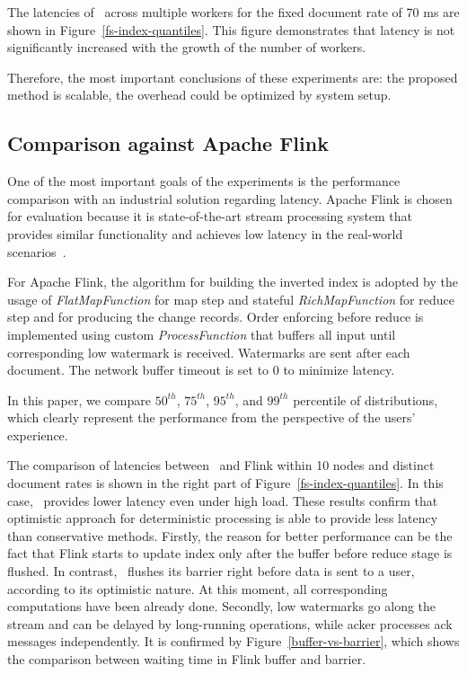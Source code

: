 The latencies of \FlameStream\ across multiple workers for the fixed document rate of 70 ms are shown in Figure~\ref{fs-index-quantiles}. This figure demonstrates that latency is not significantly increased with the growth of the number of workers. 

Therefore, the most important conclusions of these experiments are: the proposed method is scalable, the overhead could be optimized by system setup.

\subsection{Comparison against Apache Flink}

One of the most important goals of the experiments is the performance comparison with an industrial solution regarding latency. Apache Flink is chosen for evaluation because it is state-of-the-art stream processing system that provides similar functionality and achieves low latency in the real-world scenarios~\cite{S7530084}. 

For Apache Flink, the algorithm for building the inverted index is adopted by the usage of {\it FlatMapFunction} for map step and stateful {\it RichMapFunction} for reduce step and for producing the change records. Order enforcing before reduce is implemented using custom {\it ProcessFunction} that buffers all input until corresponding low watermark is received. Watermarks are sent after each document. The network buffer timeout is set to 0 to minimize latency.

In this paper, we compare $50^{th}$, $75^{th}$, $95^{th}$, and $99^{th}$ percentile of distributions, which clearly represent the performance from the perspective of the users' experience.

The comparison of latencies between \FlameStream\ and Flink within 10 nodes and distinct document rates is shown in the right part of Figure~\ref{fs-index-quantiles}. In this case, \FlameStream\ provides lower latency even under high load. These results confirm that optimistic approach for deterministic processing is able to provide less latency than conservative methods. Firstly, the reason for better performance can be the fact that Flink starts to update index only after the buffer before reduce stage is flushed. In contrast, \FlameStream\ flushes its barrier right before data is sent to a user, according to its optimistic nature. At this moment, all corresponding computations have been already done. Secondly, low watermarks go along the stream and can be delayed by long-running operations, while acker processes ack messages independently. It is confirmed by Figure~\ref{buffer-vs-barrier}, which shows the comparison between waiting time in Flink buffer and \FlameStream barrier.

